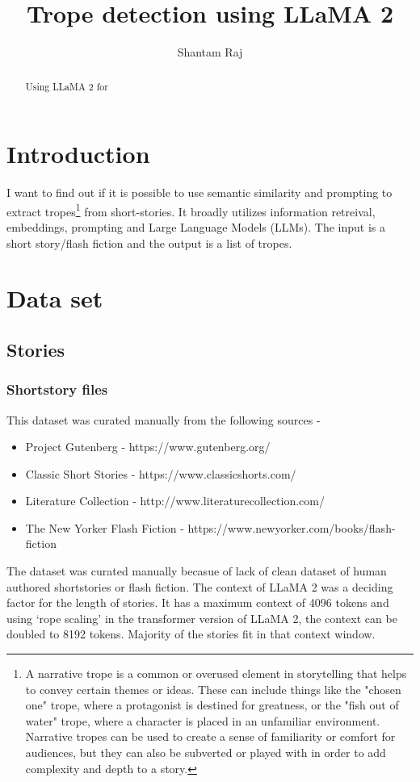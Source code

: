 \documentclass[11pt]{article}
\title{Trope detection using LLaMA 2 \\


}
\author{Shantam Raj}
\begin{document}
\maketitle

\begin{abstract}
Using LLaMA 2 for \cite{touvron_2023_llama}
\end{abstract}

\section{Introduction}
I want to find out if it is possible to use semantic similarity and prompting to extract tropes\footnote[1]{A narrative trope is a common or overused element in storytelling that helps to convey certain themes or ideas. These can include things like the "chosen one" trope, where a protagonist is destined for greatness, or the "fish out of water" trope, where a character is placed in an unfamiliar environment. Narrative tropes can be used to create a sense of familiarity or comfort for audiences, but they can also be subverted or played with in order to add complexity and depth to a story.} from short-stories. It broadly utilizes information retreival, embeddings, prompting and Large Language Models (LLMs). The input is a short story/flash fiction and the output is a list of tropes.

\section{Data set}

\subsection{Stories}

\subsubsection{Shortstory files}
This dataset was curated manually from the following sources - 
\begin{itemize}
  \item Project Gutenberg - https://www.gutenberg.org/
  \item Classic Short Stories - https://www.classicshorts.com/
  \item Literature Collection - http://www.literaturecollection.com/
  \item The New Yorker Flash Fiction - https://www.newyorker.com/books/flash-fiction
\end{itemize}
The dataset was curated manually becasue of lack of clean dataset of human authored shortstories or flash fiction. The context of LLaMA 2 was a deciding factor for the length of stories. It has a maximum context of 4096 tokens and using `rope scaling' in the transformer version of LLaMA 2, the context can be doubled to 8192 tokens. Majority of the stories fit in that context window.
\end{document}
